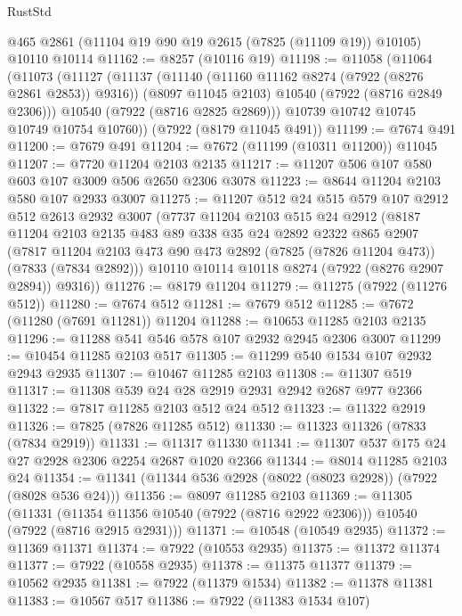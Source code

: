 \begin{lexlean}{RustStd}
\begin{coremodule}
    @465
    @2861
    (@11104 @19 @90 @19 @2615 (@7825 (@11109 @19)) @10105)
    @10110
    @10114
@11162 := @8257 (@10116 @19)
@11198 := @11058
    (@11064
      (@11073
        (@11127
          (@11137
            (@11140 (@11160 @11162 @8274 (@7922 (@8276 @2861 @2853)) @9316))
            (@8097 @11045 @2103)
            @10540
            (@7922 (@8716 @2849 @2306)))
          @10540
          (@7922 (@8716 @2825 @2869)))
        @10739
        @10742
        @10745
        @10749
        @10754
        @10760))
    (@7922 (@8179 @11045 @491))
@11199 := @7674 @491
@11200 := @7679 @491
@11204 := @7672 (@11199 (@10311 @11200)) @11045
@11207 := @7720 @11204 @2103 @2135
@11217 := @11207 @506 @107 @580 @603 @107 @3009 @506 @2650 @2306 @3078
@11223 := @8644 @11204 @2103 @580 @107 @2933 @3007
@11275 := @11207
    @512
    @24
    @515
    @579
    @107
    @2912
    @512
    @2613
    @2932
    @3007
    (@7737
      @11204
      @2103
      @515
      @24
      @2912
      (@8187
        @11204
        @2103
        @2135
        @483
        @89
        @338
        @35
        @24
        @2892
        @2322
        @865
        @2907
        (@7817 @11204 @2103 @473 @90 @473 @2892 (@7825 (@7826 @11204 @473)) (@7833 (@7834 @2892)))
        @10110
        @10114
        @10118
        @8274
        (@7922 (@8276 @2907 @2894))
        @9316))
@11276 := @8179 @11204
@11279 := @11275 (@7922 (@11276 @512))
@11280 := @7674 @512
@11281 := @7679 @512
@11285 := @7672 (@11280 (@7691 @11281)) @11204
@11288 := @10653 @11285 @2103 @2135
@11296 := @11288 @541 @546 @578 @107 @2932 @2945 @2306 @3007
@11299 := @10454 @11285 @2103 @517
@11305 := @11299 @540 @1534 @107 @2932 @2943 @2935
@11307 := @10467 @11285 @2103
@11308 := @11307 @519
@11317 := @11308 @539 @24 @28 @2919 @2931 @2942 @2687 @977 @2366
@11322 := @7817 @11285 @2103 @512 @24 @512
@11323 := @11322 @2919
@11326 := @7825 (@7826 @11285 @512)
@11330 := @11323 @11326 (@7833 (@7834 @2919))
@11331 := @11317 @11330
@11341 := @11307 @537 @175 @24 @27 @2928 @2306 @2254 @2687 @1020 @2366
@11344 := @8014 @11285 @2103 @24
@11354 := @11341 (@11344 @536 @2928 (@8022 (@8023 @2928)) (@7922 (@8028 @536 @24)))
@11356 := @8097 @11285 @2103
@11369 := @11305
    (@11331 (@11354 @11356 @10540 (@7922 (@8716 @2922 @2306))) @10540 (@7922 (@8716 @2915 @2931)))
@11371 := @10548 (@10549 @2935)
@11372 := @11369 @11371
@11374 := @7922 (@10553 @2935)
@11375 := @11372 @11374
@11377 := @7922 (@10558 @2935)
@11378 := @11375 @11377
@11379 := @10562 @2935
@11381 := @7922 (@11379 @1534)
@11382 := @11378 @11381
@11383 := @10567 @517
@11386 := @7922 (@11383 @1534 @107)

\end{coremodule}
\end{lexlean}
